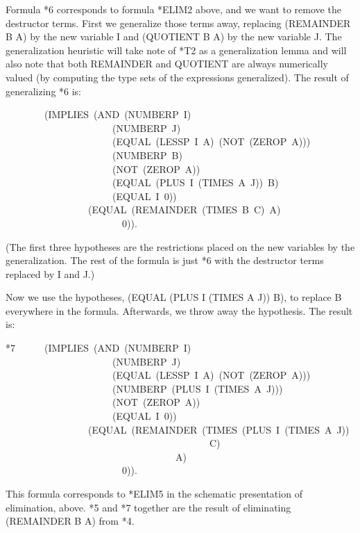 \documentclass[11pt]{book}
\newenvironment{pubasis}{\begin{flushleft}\ttfamily\small}{\normalsize\rmfamily\end{flushleft}}
\begin{document}
Formula *6 corresponds to formula *ELIM2 above, and we want to remove the
destructor terms.  First we generalize those terms away, replacing
(REMAINDER B A) by the new variable I and (QUOTIENT B A) by the new
variable J.  The generalization heuristic will take note of *T2 as a
generalization lemma and will also note that both REMAINDER and QUOTIENT
are always numerically valued (by computing the type sets of
the expressions generalized).  The result of generalizing *6 is:
\begin{pubasis}
~~~~~~~~(IMPLIES~(AND~(NUMBERP~I)\\
~~~~~~~~~~~~~~~~~~~~~~(NUMBERP~J)\\
~~~~~~~~~~~~~~~~~~~~~~(EQUAL~(LESSP~I~A)~(NOT~(ZEROP~A)))\\
~~~~~~~~~~~~~~~~~~~~~~(NUMBERP~B)\\
~~~~~~~~~~~~~~~~~~~~~~(NOT~(ZEROP~A))\\
~~~~~~~~~~~~~~~~~~~~~~(EQUAL~(PLUS~I~(TIMES~A~J))~B)\\
~~~~~~~~~~~~~~~~~~~~~~(EQUAL~I~0))\\
~~~~~~~~~~~~~~~~~(EQUAL~(REMAINDER~(TIMES~B~C)~A)\\
~~~~~~~~~~~~~~~~~~~~~~~~0)).\\
\end{pubasis}
(The first three hypotheses are the restrictions placed on the new
variables by the generalization.  The rest of the
formula is just *6 with the destructor terms replaced by I and J.)

Now we use the hypotheses, (EQUAL (PLUS I (TIMES A J)) B), to
replace B everywhere in the formula.  Afterwards, we throw away the
hypothesis.  The result is:
\begin{pubasis}
*7~~~~~~(IMPLIES~(AND~(NUMBERP~I)\\
~~~~~~~~~~~~~~~~~~~~~~(NUMBERP~J)\\
~~~~~~~~~~~~~~~~~~~~~~(EQUAL~(LESSP~I~A)~(NOT~(ZEROP~A)))\\
~~~~~~~~~~~~~~~~~~~~~~(NUMBERP~(PLUS~I~(TIMES~A~J)))\\
~~~~~~~~~~~~~~~~~~~~~~(NOT~(ZEROP~A))\\
~~~~~~~~~~~~~~~~~~~~~~(EQUAL~I~0))\\
~~~~~~~~~~~~~~~~~(EQUAL~(REMAINDER~(TIMES~(PLUS~I~(TIMES~A~J))\\
~~~~~~~~~~~~~~~~~~~~~~~~~~~~~~~~~~~~~~~~~~C)\\
~~~~~~~~~~~~~~~~~~~~~~~~~~~~~~~~~~~A)\\
~~~~~~~~~~~~~~~~~~~~~~~~0)).\\
\end{pubasis}
This formula corresponds to *ELIM5 in the  schematic presentation
of elimination, above.  *5 and *7 together are the result of eliminating
(REMAINDER B A) from *4. 
\end{document}
